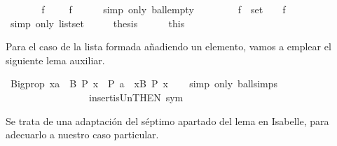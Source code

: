 \begin{isabellebody}
\ \ \isamarkupfalse%
\ \isamarkupfalse%
\ {\isachardoublequoteopen}{\isasymdots}\ {\isacharequal}\ {\isacharparenleft}{\isasymforall}f\ {\isasymin}\ {\isasymemptyset}{\isachardot}\ {\isasymA}\ {\isasymTurnstile}\ f{\isacharparenright}{\isachardoublequoteclose}\isanewline
\ \ \ \ \isamarkupfalse%
\ {\isacharparenleft}simp\ only{\isacharcolon}\ ball{\isacharunderscore}empty{\isacharparenright}\ \isanewline
\ \ \isamarkupfalse%
\ \isamarkupfalse%
\ {\isachardoublequoteopen}{\isasymdots}\ {\isacharequal}\ {\isacharparenleft}{\isasymforall}f\ {\isasymin}\ set\ {\isacharbrackleft}{\isacharbrackright}{\isachardot}\ {\isasymA}\ {\isasymTurnstile}\ f{\isacharparenright}{\isachardoublequoteclose}\isanewline
\ \ \ \ \isamarkupfalse%
\ {\isacharparenleft}simp\ only{\isacharcolon}\ list{\isachardot}set{\isacharparenright}\isanewline
\ \ \isamarkupfalse%
\ \isamarkupfalse%
\ {\isacharquery}thesis\isanewline
\ \ \ \ \isamarkupfalse%
\ this\isanewline
{}\isamarkupfalse%
%
\endisatagproof
{\isafoldproof}%
%
\isadelimproof
%
\endisadelimproof
%
\begin{isamarkuptext}%
Para el caso de la lista formada añadiendo un elemento, vamos a
  emplear el siguiente lema auxiliar.%
\end{isamarkuptext}\isamarkuptrue%
\isamarkupfalse%
\ Bigprop{}{\isacharcolon}\ {\isachardoublequoteopen}{\isacharparenleft}{\isasymforall}x{\isasymin}{\isacharparenleft}{\isacharbraceleft}a{\isacharbraceright}\ {\isasymunion}\ B{\isacharparenright}{\isachardot}\ P\ x{\isacharparenright}\ {\isacharequal}\ {\isacharparenleft}P\ a\ {\isasymand}\ {\isacharparenleft}{\isasymforall}x{\isasymin}B{\isachardot}\ P\ x{\isacharparenright}{\isacharparenright}{\isachardoublequoteclose}\isanewline
%
\isadelimproof
\ \ %
\endisadelimproof
%
\isatagproof
{}\isamarkupfalse%
\ {\isacharparenleft}simp\ only{\isacharcolon}\ ball{\isacharunderscore}simps{\isacharparenleft}{}{\isacharparenright}\isanewline
\ \ \ \ \ \ \ \ \ \ \ \ \ \ \ \ \ insert{\isacharunderscore}is{\isacharunderscore}Un{\isacharbrackleft}THEN\ sym{\isacharbrackright}{\isacharparenright}%
\endisatagproof
{\isafoldproof}%
%
\isadelimproof
%
\endisadelimproof
%
\begin{isamarkuptext}%
Se trata de una adaptación del séptimo apartado del lema 
   en Isabelle, para adecuarlo a nuestro caso particular. 


\end{isamarkuptext}
\end{isabellebody}
